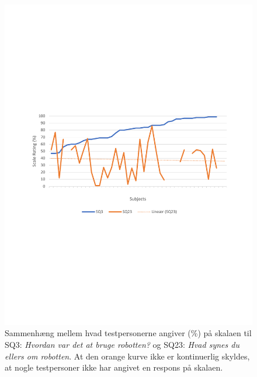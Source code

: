 \begin{figure}[H]
	\centering
	\includegraphics[width=\textwidth]{Figure/Korrelationsgrafer/SQ3+SQ23}
	\caption{Sammenhæng mellem hvad testpersonerne angiver (\%) på skalaen til SQ3: \textit{Hvordan var det at bruge robotten?} og SQ23: \textit{Hvad synes du ellers om robotten}. At den orange kurve ikke er kontinuerlig skyldes, at nogle testpersoner ikke har angivet en respons på skalaen.}
	\label{fig:SammenligningSQ3SQ23}
\end{figure}
\noindent
%